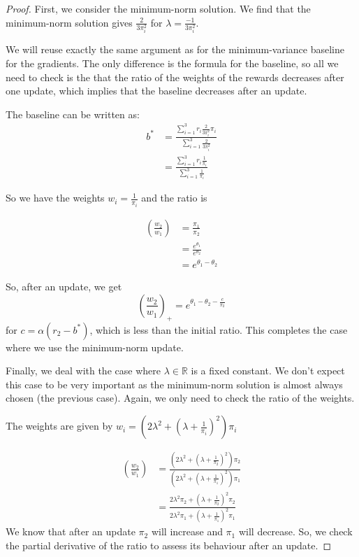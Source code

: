 \begin{proof}
First, we consider the minimum-norm solution. We find that the minimum-norm solution gives $\frac{2}{3\pi_i^2}$ for $\lambda = \frac{-1}{3\pi_i^2}$. 

We will reuse exactly the same argument as for the minimum-variance baseline for the gradients. The only difference is the formula for the baseline, so all we need to check is the that the ratio of the weights of the rewards decreases after one update, which implies that the baseline decreases after an update.

The baseline can be written as:
\begin{align*}
    b^* &= \frac{\sum_{i=1}^3 r_i \frac{2}{3 \pi_i^2} \pi_i}{\sum_{i=1}^3  \frac{2}{3 \pi_i^2}} \\
    &= \frac{\sum_{i=1}^3 r_i \frac{1}{\pi_i} }{\sum_{i=1}^3 \frac{1}{\pi_i} } 
\end{align*}

So we have the weights $w_i = \frac{1}{\pi_i}$ and the ratio is 

\begin{align*}
    \left( \frac{w_2}{w_1} \right) &= \frac{\pi_1}{\pi_2} \\
    &= \frac{e^{\theta_1} }{e^{\theta_2}} \\
    & = e^{\theta_1 - \theta_2}
\end{align*}

So, after an update, we get
\[ \left( \frac{w_2}{w_1} \right)_+ = e^{\theta_1 - \theta_2 - \frac{c}{\pi_2}} \]
for $c = \alpha(r_2 - b^*)$, 
which is less than the initial ratio. 
This completes the case where we use the minimum-norm update.

Finally, we deal with the case where $\lambda \in \mathbb{R}$ is a fixed constant. We don't expect this case to be very important as the minimum-norm solution is almost always chosen (the previous case).
Again, we only need to check the ratio of the weights.

The weights are given by $w_i = (2\lambda^2 + (\lambda + \frac{1}{\pi_i})^2) \pi_i$

\begin{align*}
    \left( \frac{w_2}{w_1} \right) &= \frac{(2\lambda^2 + (\lambda + \frac{1}{\pi_2})^2) \pi_2}{(2\lambda^2 + (\lambda + \frac{1}{\pi_1})^2) \pi_1} \\
    &= \frac{2\lambda^2 \pi_2 + (\lambda + \frac{1}{\pi_2})^2 \pi_2 }{
    2\lambda^2 \pi_1 + (\lambda + \frac{1}{\pi_1})^2 \pi_1 }
\end{align*}
We know that after an update $\pi_2$ will increase and $\pi_1$ will decrease. 
So, we check the partial derivative of the ratio to assess its behaviour after an update.


\end{proof}

